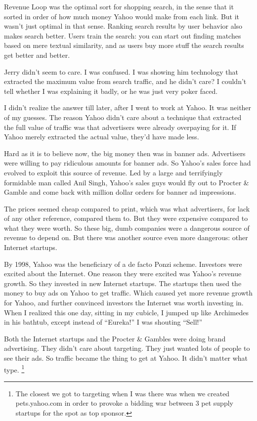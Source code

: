 \documentclass[12pt]{book}
\begin{document}
Revenue Loop was the optimal sort for shopping search, in the sense that
it sorted in order of how much money Yahoo would make from each link.
But it wasn't just optimal in that sense. Ranking search results by user
behavior also makes search better. Users train the search: you can start
out finding matches based on mere textual similarity, and as users buy
more stuff the search results get better and better.

Jerry didn't seem to care. I was confused. I was showing him technology
that extracted the maximum value from search traffic, and he didn't
care? I couldn't tell whether I was explaining it badly, or he was just
very poker faced.

I didn't realize the answer till later, after I went to work at Yahoo.
It was neither of my guesses. The reason Yahoo didn't care about a
technique that extracted the full value of traffic was that advertisers
were already overpaying for it. If Yahoo merely extracted the actual
value, they'd have made less.

Hard as it is to believe now, the big money then was in banner ads.
Advertisers were willing to pay ridiculous amounts for banner ads. So
Yahoo's sales force had evolved to exploit this source of revenue. Led
by a large and terrifyingly formidable man called Anil Singh, Yahoo's
sales guys would fly out to Procter \& Gamble and come back with million
dollar orders for banner ad impressions.

The prices seemed cheap compared to print, which was what advertisers,
for lack of any other reference, compared them to. But they were
expensive compared to what they were worth. So these big, dumb companies
were a dangerous source of revenue to depend on. But there was another
source even more dangerous: other Internet startups.

By 1998, Yahoo was the beneficiary of a de facto Ponzi scheme. Investors
were excited about the Internet. One reason they were excited was
Yahoo's revenue growth. So they invested in new Internet startups. The
startups then used the money to buy ads on Yahoo to get traffic. Which
caused yet more revenue growth for Yahoo, and further convinced
investors the Internet was worth investing in. When I realized this one
day, sitting in my cubicle, I jumped up like Archimedes in his bathtub,
except instead of ``Eureka!'' I was shouting ``Sell!''

Both the Internet startups and the Procter \& Gambles were doing brand
advertising. They didn't care about targeting. They just wanted lots of
people to see their ads. So traffic became the thing to get at Yahoo. It
didn't matter what type. \footnote{The closest we got to targeting when I was there was when we
created pets.yahoo.com in order to provoke a bidding war between 3 pet
supply startups for the spot as top sponsor.}
\end{document}
